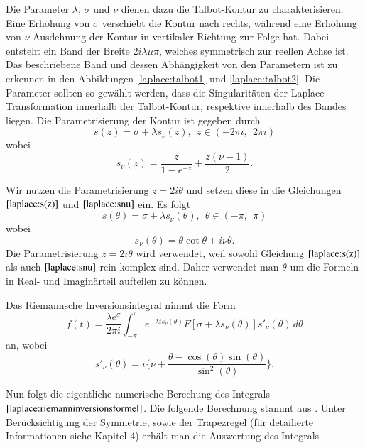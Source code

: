 Die Parameter $\lambda$, $\sigma$ und $\nu$ dienen dazu die
Talbot-Kontur zu charakterisieren. Eine Erhöhung von $\sigma$ verschiebt
die Kontur nach rechts, während eine Erhöhung von $\nu$ Ausdehnung
der Kontur
in vertikaler Richtung zur Folge hat. Dabei entsteht ein Band der Breite $2i\lambda\mu\pi$, welches symmetrisch zur reellen Achse ist. Das beschriebene Band und dessen Abhängigkeit von den Parametern ist zu erkennen in den Abbildungen \ref{laplace:talbot1} und \ref{laplace:talbot2}.
Die Parameter sollten so gewählt werden, dass die Singularitäten
der Laplace-Transformation innerhalb der Talbot-Kontur, respektive
innerhalb des Bandes liegen.
Die Parametrisierung der Kontur ist gegeben durch
\begin{equation}
s(z) = \sigma+\lambda s_{\nu}(z),~~ z\in (-2\pi i,~~2\pi i)
\label{laplace:s(z)}
\end{equation}
wobei
\begin{equation}
s_{\nu}(z)=\frac{z}{1-e^{-z}}+\frac{z(\nu-1)}{2}.
\label{laplace:snu}
\end{equation}

Wir nutzen die Parametrisierung $z=2i\theta$ und setzen diese in die Gleichungen $\eqref{laplace:s(z)}$ und $\eqref{laplace:snu}$ ein. Es folgt
\begin{equation}
s(\theta) = \sigma+\lambda s_{\nu}(\theta),~~ \theta\in (-\pi ,~~\pi)
\end{equation}
wobei
\begin{equation}
s_{\nu}(\theta)=\theta \cot\theta+i\nu\theta.
\end{equation}
Die Parametrisierung $z=2i\theta$ wird verwendet, weil sowohl
Gleichung $\eqref{laplace:s(z)}$ als auch $\eqref{laplace:snu}$
rein komplex sind. Daher verwendet man $\theta$ um die Formeln in
Real- und Imaginärteil aufteilen zu können.

Das Riemannsche Inversionsintegral nimmt die Form 
\begin{equation}
f(t)=\frac{\lambda e^{\sigma}}{2\pi i}\int_{-\pi}^{\pi} e^{-\lambda ts_{\nu}(\theta)}F[\sigma + \lambda s_{\nu}(\theta)]s'_{\nu}(\theta)\,d\theta
\end{equation}
an, wobei
\begin{equation}
s'_{\nu}(\theta) = i \Biggl\{\nu + \frac{\theta-\cos(\theta)\sin(\theta)}{\sin^{2}(\theta)}  \Biggr\}.
\end{equation}


Nun folgt die eigentliche numerische Berechung des Integrals
$\eqref{laplace:riemanninversionsformel}$. Die folgende Berechnung
stammt aus \cite{laplace:talbot}.
Unter Berücksichtigung der
Symmetrie, sowie der Trapezregel (für detailierte Informationen
siehe Kapitel 4) erhält man die Auswertung des Integrals

